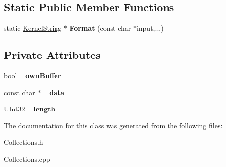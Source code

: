 \subsection*{Static Public Member Functions}
\begin{DoxyCompactItemize}
\item 
\mbox{\label{class_kernel_string_a7eb431d5935c958d0067767a5f4caa1a}} 
static \hyperlink{class_kernel_string}{Kernel\+String} $\ast$ {\bfseries Format} (const char $\ast$input,...)
\end{DoxyCompactItemize}
\subsection*{Private Attributes}
\begin{DoxyCompactItemize}
\item 
\mbox{\label{class_kernel_string_a8821aa77d0edec8fd37bd7c267604365}} 
bool {\bfseries \+\_\+own\+Buffer}
\item 
\mbox{\label{class_kernel_string_aee3c06a5a2987740980b6d98dd7c3d3c}} 
const char $\ast$ {\bfseries \+\_\+data}
\item 
\mbox{\label{class_kernel_string_a96630b5976b8488a6e7cd9658337e5f3}} 
U\+Int32 {\bfseries \+\_\+length}
\end{DoxyCompactItemize}


The documentation for this class was generated from the following files\+:\begin{DoxyCompactItemize}
\item 
Collections.\+h\item 
Collections.\+cpp\end{DoxyCompactItemize}
